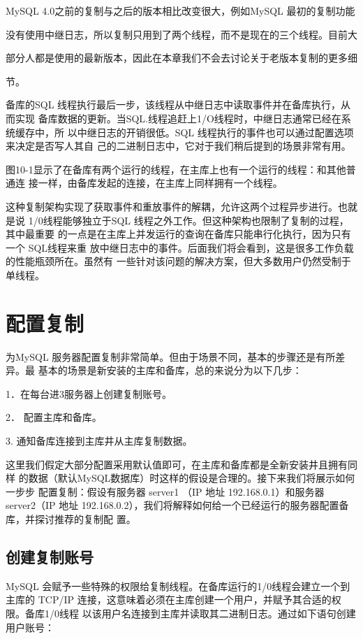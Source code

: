 MySQL 4.0之前的复制与之后的版本相比改变很大，例如MySQL 最初的复制功能

没有使用中继日志，所以复制只用到了两个线程，而不是现在的三个线程。目前大

部分人都是使用的最新版本，因此在本章我们不会去讨论关于老版本复制的更多细

节。

备库的SQL 线程执行最后一步，该线程从中继日志中读取事件并在备库执行，从而实现
备库数据的更新。当SQL.线程追赶上1/O线程时，中继日志通常已经在系统缓存中，所
以中继日志的开销很低。SQL 线程执行的事件也可以通过配置选项来决定是否写人其自
己的二进制日志中，它对于我们稍后提到的场景非常有用。

图10-1显示了在备库有两个运行的线程，在主库上也有一个运行的线程：和其他普通连
接一样，由备库发起的连接，在主库上同样拥有一个线程。

这种复制架构实现了获取事件和重放事件的解耦，允许这两个过程异步进行。也就是说
1/0线程能够独立于SQL 线程之外工作。但这种架构也限制了复制的过程，其中最重要
的一点是在主库上并发运行的查询在备库只能串行化执行，因为只有一个 SQL线程来重
放中继日志中的事件。后面我们将会看到，这是很多工作负载的性能瓶颈所在。虽然有
一些针对该问题的解决方案，但大多数用户仍然受制于单线程。

\section{配置复制}
为MySQL 服务器配置复制非常简单。但由于场景不同，基本的步骤还是有所差异。最
基本的场景是新安装的主库和备库，总的来说分为以下几步：

1．在每台进3服务器上创建复制账号。

2． 配置主库和备库。

3. 通知备库连接到主库井从主库复制数据。

这里我们假定大部分配置采用默认值即可，在主库和备库都是全新安装井且拥有同样
的数据（默认MySQL数据库）时这样的假设是合理的。接下来我们将展示如何一步步
配置复制：假设有服务器 server1 （IP 地址 192.168.0.1）和服务器 server2（IP 地址
192.168.0.2），我们将解释如何给一个已经运行的服务器配置备库，并探讨推荐的复制配
置。

\subsection{创建复制账号}
MySQL 会赋予一些特殊的权限给复制线程。在备库运行的1/0线程会建立一个到主库的
TCP/IP 连接，这意味着必须在主库创建一个用户，并赋予其合适的权限。备库1/0线程
以该用户名连接到主库并读取其二进制日志。通过如下语句创建用户账号：

